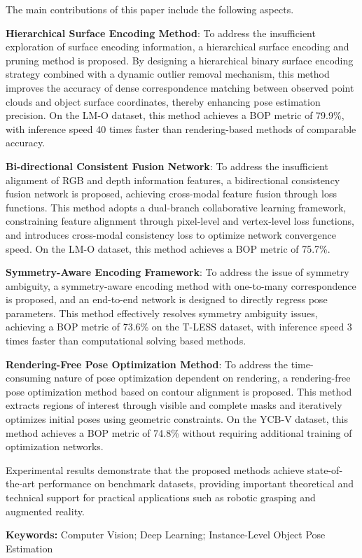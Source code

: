 \par The main contributions of this paper include the following aspects.
\par \textbf{Hierarchical Surface Encoding Method}: To address the insufficient exploration of surface encoding information, a hierarchical surface encoding and pruning method is proposed. By designing a hierarchical binary surface encoding strategy combined with a dynamic outlier removal mechanism, this method improves the accuracy of dense correspondence matching between observed point clouds and object surface coordinates, thereby enhancing pose estimation precision. On the LM-O dataset, this method achieves a BOP metric of 79.9\%, with inference speed 40 times faster than rendering-based methods of comparable accuracy.
\par \textbf{Bi-directional Consistent Fusion Network}: To address the insufficient alignment of RGB and depth information features, a bidirectional consistency fusion network is proposed, achieving cross-modal feature fusion through loss functions. This method adopts a dual-branch collaborative learning framework, constraining feature alignment through pixel-level and vertex-level loss functions, and introduces cross-modal consistency loss to optimize network convergence speed. On the LM-O dataset, this method achieves a BOP metric of 75.7\%.
\par \textbf{Symmetry-Aware Encoding Framework}: To address the issue of symmetry ambiguity, a symmetry-aware encoding method with one-to-many correspondence is proposed, and an end-to-end network is designed to directly regress pose parameters. This method effectively resolves symmetry ambiguity issues, achieving a BOP metric of 73.6\% on the T-LESS dataset, with inference speed 3 times faster than computational solving based methods.
\par \textbf{Rendering-Free Pose Optimization Method}: To address the time-consuming nature of pose optimization dependent on rendering, a rendering-free pose optimization method based on contour alignment is proposed. This method extracts regions of interest through visible and complete masks and iteratively optimizes initial poses using geometric constraints. On the YCB-V dataset, this method achieves a BOP metric of 74.8\% without requiring additional training of optimization networks.
\par Experimental results demonstrate that the proposed methods achieve state-of-the-art performance on benchmark datasets, providing important theoretical and technical support for practical applications such as robotic grasping and augmented reality.
\par \textbf{Keywords:} Computer Vision; Deep Learning; Instance-Level Object Pose Estimation
